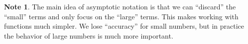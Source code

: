 \documentclass[10pt]{article}
\theoremstyle{definition}
\newtheorem{note}[problem]{Note}
\begin{document}
\newpage

\begin{note}
    The main idea of asymptotic notation is that we can ``discard'' the ``small'' terms and only focus on the ``large'' terms.
    This makes working with functions much simpler.
    We lose ``accuracy'' for small numbers,
    but in practice the behavior of large numbers is much more important.
\end{note}
\begin{center}
\end{center}
\end{document}
